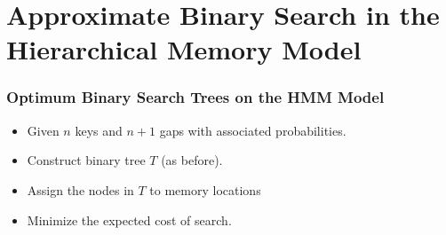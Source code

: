 \documentclass{beamer}
\theoremstyle{plain}
\begin{document}
\section{Approximate Binary Search in the Hierarchical Memory Model}\label{Approximate Binary Search in the Hierarchical Memory Model} 

\begin{frame} \frametitle{Optimum Binary Search Trees on the HMM Model}
\begin{itemize}
\item Given $n$ keys and $n+1$ gaps with associated probabilities.  
\item Construct binary tree $T$ (as before).
\item Assign the nodes in $T$ to memory locations
\item Minimize the expected cost of search.
\end{itemize}
\end{frame}
 
\end{document}
